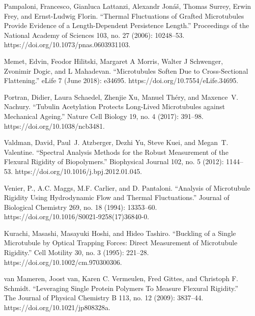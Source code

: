 \begin{thebibliography}{00}
Pampaloni, Francesco, Gianluca Lattanzi, Alexandr Jonáš, Thomas Surrey, Erwin Frey, and Ernst-Ludwig Florin. “Thermal Fluctuations of Grafted Microtubules Provide Evidence of a Length-Dependent Persistence Length.” Proceedings of the National Academy of Sciences 103, no. 27 (2006): 10248–53. https://doi.org/10.1073/pnas.0603931103. %

Memet, Edvin, Feodor Hilitski, Margaret A Morris, Walter J Schwenger, Zvonimir Dogic, and L Mahadevan. “Microtubules Soften Due to Cross-Sectional Flattening.” eLife 7 (June 2018): e34695. https://doi.org/10.7554/eLife.34695. %

Portran, Didier, Laura Schaedel, Zhenjie Xu, Manuel Théry, and Maxence V. Nachury. “Tubulin Acetylation Protects Long-Lived Microtubules against Mechanical Ageing.” Nature Cell Biology 19, no. 4 (2017): 391–98. https://doi.org/10.1038/ncb3481. %

Valdman, David, Paul J. Atzberger, Dezhi Yu, Steve Kuei, and Megan T. Valentine. “Spectral Analysis Methods for the Robust Measurement of the Flexural Rigidity of Biopolymers.” Biophysical Journal 102, no. 5 (2012): 1144–53. https://doi.org/10.1016/j.bpj.2012.01.045.

Venier, P., A.C. Maggs, M.F. Carlier, and D. Pantaloni. “Analysis of Microtubule Rigidity Using Hydrodynamic Flow and Thermal Fluctuations.” Journal of Biological Chemistry 269, no. 18 (1994): 13353–60. https://doi.org/10.1016/S0021-9258(17)36840-0.

Kurachi, Masashi, Masayuki Hoshi, and Hideo Tashiro. “Buckling of a Single Microtubule by Optical Trapping Forces: Direct Measurement of Microtubule Rigidity.” Cell Motility 30, no. 3 (1995): 221–28. https://doi.org/10.1002/cm.970300306.

van Mameren, Joost van, Karen C. Vermeulen, Fred Gittes, and Christoph F. Schmidt. “Leveraging Single Protein Polymers To Measure Flexural Rigidity.” The Journal of Physical Chemistry B 113, no. 12 (2009): 3837–44. https://doi.org/10.1021/jp808328a.


\end{thebibliography}
